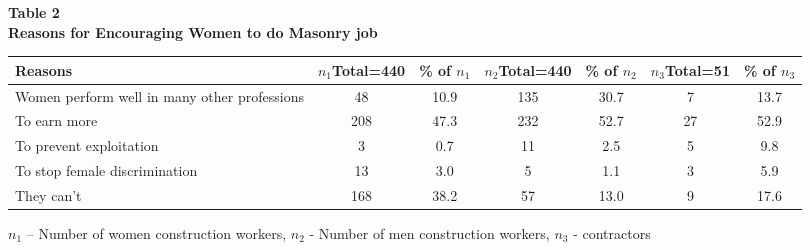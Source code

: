 \documentclass[12pt]{report}
\newcommand{\bt}[1]{\textbf{#1}}
\newcommand{\NI}{\noindent}
\begin{document}
	\NI\bt{Table 2}\\
	\bt{Reasons for Encouraging Women to do Masonry job}
	\begin{longtable}{p{}@{\hskip 0.06in}c@{\hskip 0.07in}c@{\hskip 0.08in}c@{\hskip 0.07in}c@{\hskip 0.08in}c@{\hskip 0.08in}c}
		\hline
		\bt{Reasons} &$n_1${\footnotesize Total=440} & {\footnotesize\% of }$n_1$   &    $n_2${\footnotesize Total=440}  & {\footnotesize\% of }$n_2$   & $n_3${\footnotesize Total=51}  & {\footnotesize\% of }$n_3$\\ \hline
		 Women perform well in many other 
		 professions  & 48 & 10.9 & 135 & 30.7 & 7 & 13.7 \\ \hline
		To earn more & 208 & 47.3  & 232  & 52.7  & 27 & 52.9 \\ \hline
		To prevent exploitation & 3  &  0.7 & 11  & 2.5  & 5  & 9.8 \\ \hline
		To stop female discrimination &  13 & 3.0 & 5 & 1.1 & 3  & 5.9 \\ \hline
		They can't & 168 & 38.2  & 57 & 13.0  & 9 & 17.6 \\ \hline
	\end{longtable}
	$n_1$ – Number of women construction workers, $n_2$ - Number of men construction workers, $n_3$ - contractors\\
	
\end{document}
